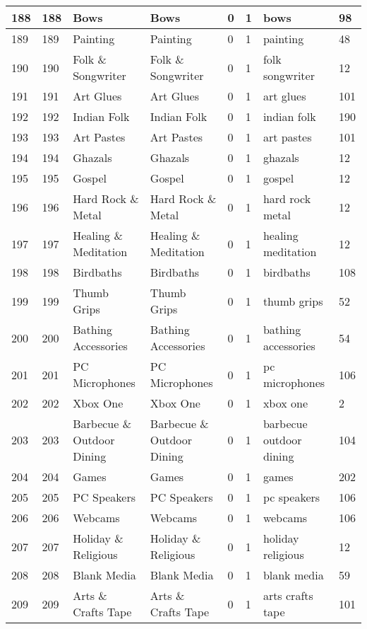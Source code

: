 \begin{longtable}{|l|l|l|l|l|l|l|l|}
188 & 188 & Bows & Bows & 0 & 1 & bows & 98 \\ \hline 
189 & 189 & Painting & Painting & 0 & 1 & painting & 48 \\ \hline 
190 & 190 & Folk \& Songwriter & Folk \& Songwriter & 0 & 1 & folk songwriter & 12 \\ \hline 
191 & 191 & Art Glues & Art Glues & 0 & 1 & art glues & 101 \\ \hline 
192 & 192 & Indian Folk & Indian Folk & 0 & 1 & indian folk & 190 \\ \hline 
193 & 193 & Art Pastes & Art Pastes & 0 & 1 & art pastes & 101 \\ \hline 
194 & 194 & Ghazals & Ghazals & 0 & 1 & ghazals & 12 \\ \hline 
195 & 195 & Gospel & Gospel & 0 & 1 & gospel & 12 \\ \hline 
196 & 196 & Hard Rock \& Metal & Hard Rock \& Metal & 0 & 1 & hard rock metal & 12 \\ \hline 
197 & 197 & Healing \& Meditation & Healing \& Meditation & 0 & 1 & healing meditation & 12 \\ \hline 
198 & 198 & Birdbaths & Birdbaths & 0 & 1 & birdbaths & 108 \\ \hline 
199 & 199 & Thumb Grips & Thumb Grips & 0 & 1 & thumb grips & 52 \\ \hline 
200 & 200 & Bathing Accessories & Bathing Accessories & 0 & 1 & bathing accessories & 54 \\ \hline 
201 & 201 & PC Microphones & PC Microphones & 0 & 1 & pc microphones & 106 \\ \hline 
202 & 202 & Xbox One & Xbox One & 0 & 1 & xbox one & 2 \\ \hline 
203 & 203 & Barbecue \& Outdoor Dining & Barbecue \& Outdoor Dining & 0 & 1 & barbecue outdoor dining & 104 \\ \hline 
204 & 204 & Games & Games & 0 & 1 & games & 202 \\ \hline 
205 & 205 & PC Speakers & PC Speakers & 0 & 1 & pc speakers & 106 \\ \hline 
206 & 206 & Webcams & Webcams & 0 & 1 & webcams & 106 \\ \hline 
207 & 207 & Holiday \& Religious & Holiday \& Religious & 0 & 1 & holiday religious & 12 \\ \hline 
208 & 208 & Blank Media & Blank Media & 0 & 1 & blank media & 59 \\ \hline 
209 & 209 & Arts \& Crafts Tape & Arts \& Crafts Tape & 0 & 1 & arts crafts tape & 101 \\ \hline 

\end{longtable}
